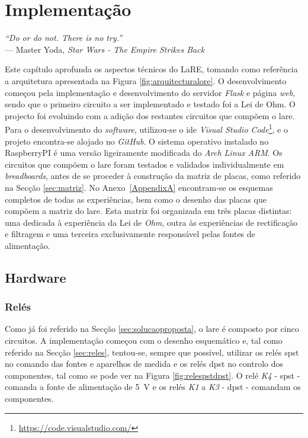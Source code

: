 \chapter{Implementação}
\label{Capítulo4}

\begin{flushright}
\textit{``Do or do not. There is no try.''} \\[0.5em]
--- Master Yoda, \textit{Star Wars - The Empire Strikes Back}
\end{flushright}


Este capítulo aprofunda os aspectos técnicos do LaRE, tomando como referência a arquitetura apresentada na Figura \ref{fig:arquitecturalore}. O desenvolvimento começou pela implementação e desenvolvimento do servidor \textit{Flask} e página \textit{web}, sendo que o primeiro circuito a ser implementado e testado foi a Lei de Ohm. O projecto foi evoluindo com a adição dos restantes circuitos que compõem o \acrshort{lare}. Para o desenvolvimento do \textit{software}, utilizou-se o \acrshort{ide} \textit{Visual Studio Code}\footnote{\url{https://code.visualstudio.com/}}, e o projeto encontra-se alojado no \textit{GitHub}. O sistema operativo instalado no \gls{RaspberryPI} é uma versão ligeiramente modificada do \textit{Arch Linux ARM}. Os circuitos que compõem o \acrshort{lare} foram testados e validados individualmente em \textit{breadboards}, antes de se proceder à construção da matriz de placas, como referido na Secção \ref{sec:matriz}. No Anexo~\ref{AppendixA} encontram-se os esquemas completos de todas as experiências, bem como o desenho das placas que compõem a matriz do \acrshort{lare}. Esta matriz foi organizada em três placas distintas: uma dedicada à experiência da Lei de \textit{Ohm}, outra às experiências de rectificação e filtragem e uma terceira exclusivamente responsável pelas fontes de alimentação.

\section{Hardware}
\subsection{Relés}
\label{sec:hwreles}
Como já foi referido na Secção \ref{sec:solucaoproposta}, o \acrshort{lare} é composto por cinco circuitos. A implementação começou com o desenho esquemático e, tal como referido na Secção \ref{sec:reles}, tentou-se, sempre que possível, utilizar os relés \acrshort{spst} no comando das fontes e aparelhos de medida e os relés \acrshort{dpst} no controlo dos componentes, tal como se pode ver na Figura \ref{fig:relespstdpst}. O relé \textit{K4} - \acrshort{spst} - comanda a fonte de alimentação de \SI{5}{\volt} e os relés \textit{K1} a \textit{K3} - \acrshort{dpst} - comandam os componentes.

